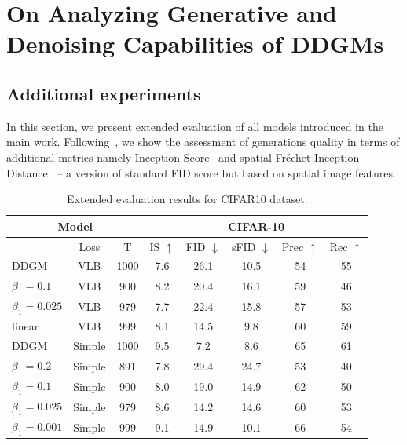 \newpage

\chapter{On Analyzing Generative and Denoising Capabilities of DDGMs}
\newpage
\section{Additional experiments} \label{appendix:extra_results}

In this section, we present extended evaluation of all models introduced in the main work. Following~\citet{nichol2021improved}, we show the assessment of generations quality in terms of additional metrics namely Inception Score~\cite{salimans2016improved} and spatial Fréchet Inception Distance~\cite{nash2021generating} -- a version of standard FID score but based on spatial image features.

\begin{table}[h]
  \centering
  \caption{Extended evaluation results for CIFAR10 dataset.
}
  \label{tab:extended_results_cifar}
  \begin{tabular}{l|c|c||ccccc}
    \toprule
     \multicolumn{3}{c||}{Model} &  \multicolumn{5}{c}{CIFAR-10}\\
    \midrule
     &Loss& T &IS  $\uparrow$&FID $\downarrow$& sFID $\downarrow$&Prec $\uparrow$&Rec $\uparrow$\\

    \midrule
    DDGM & VLB& 1000  & 7.6&26.1&10.5&54&55\\
    \ours{} $\beta_1=0.1$ & VLB &900  & 8.2&20.4&16.1&59&46\\
    \ours{} $\beta_1=0.025$ & VLB &979  & 7.7&22.4&15.8&57&53\\
    \ours{} linear &VLB& 999  & 8.1&14.5&9.8&60&59 \\
    \midrule
    DDGM & Simple & 1000  & 9.5&7.2&8.6&65&61\\
    \ours{} $\beta_1=0.2$& Simple &891 & 7.8&29.4&24.7&53&40 \\
    \ours{} $\beta_1=0.1$& Simple &900 & 8.0&19.0&14.9&62&50 \\
    \ours{} $\beta_1=0.025$& Simple &979 & 8.6&14.2&14.6&60&53 \\
    \ours{} $\beta_1=0.001$ &Simple &999 & 9.1&14.9&10.1&66&54 \\
    \bottomrule
  \end{tabular}
\vspace*{2\baselineskip}
\end{table}


